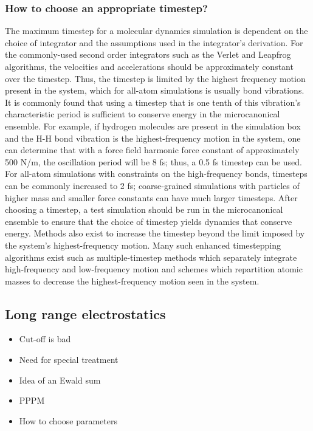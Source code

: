 \documentclass[9pt,bestpractices]{livecoms}
\begin{document}
\subsubsection{How to choose an appropriate timestep?}

The maximum timestep for a molecular dynamics simulation is dependent on the choice of integrator and the assumptions used in the integrator's derivation.
For the commonly-used second order integrators such as the Verlet and Leapfrog algorithms, the velocities and accelerations should be approximately constant over the timestep.
Thus, the timestep is limited by the highest frequency motion present in the system, which for all-atom simulations is usually bond vibrations.
It is commonly found that using a timestep that is one tenth of this vibration's characteristic period is sufficient to conserve energy in the microcanonical ensemble.
For example, if hydrogen molecules are present in the simulation box and the H-H bond vibration is the highest-frequency motion in the system, one can determine that with a force field harmonic force constant of approximately 500 N/m, the oscillation period will be 8 fs; thus, a 0.5 fs timestep can be used.
For all-atom simulations with constraints on the high-frequency bonds, timesteps can be commonly increased to 2 fs; coarse-grained simulations with particles of higher mass and smaller force constants can have much larger timesteps.
After choosing a timestep, a test simulation should be run in the microcanonical ensemble to ensure that the choice of timestep yields dynamics that conserve energy.
Methods also exist to increase the timestep beyond the limit imposed by the system's highest-frequency motion.
Many such enhanced timestepping algorithms exist such as multiple-timestep methods which separately integrate high-frequency and low-frequency motion and schemes which repartition atomic masses to decrease the highest-frequency motion seen in the system\cite{Berne:1999:Molecular,Hopkins:2015:JCTC:Long}.


\subsection{Long range electrostatics}
\label{sec:lr_electrostatics}
\begin{itemize}
\item Cut-off is bad
\item Need for special treatment
\item Idea of an Ewald sum
\item PPPM
\item How to choose parameters
\end{itemize}
\end{document}
